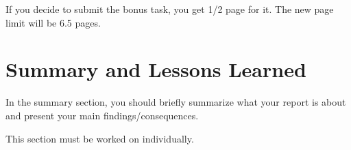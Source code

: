\documentclass[conference]{IEEEtran}
\begin{document}
If you decide to submit the bonus task, you get 1/2 page for it. The new page limit will be 6.5 pages.

\section{Summary and Lessons Learned}
\label{sec:summary}
In the summary section, you should briefly summarize what your report is about and present your main findings/consequences.

This section must be worked on individually.



\end{document}
